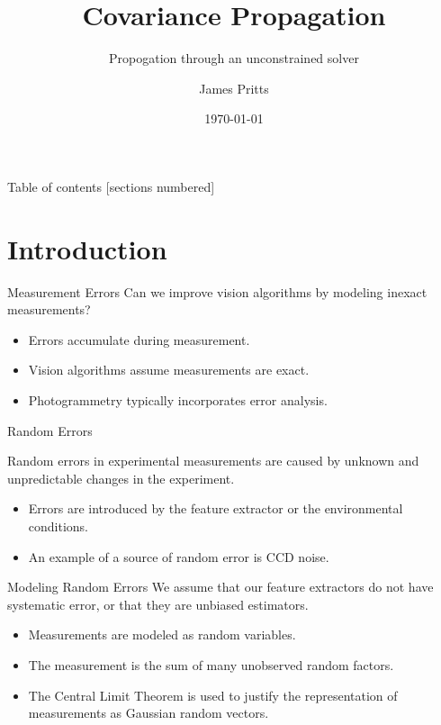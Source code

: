 \documentclass[8pt,aspectratio=169]{beamer}
\title{Covariance Propagation}
\subtitle{Propogation through an unconstrained solver}
\date{\today}
\author{James Pritts}
\institute{Ukrainian Catholic University}
\begin{document}
 

\maketitle

\begin{frame}{Table of contents}
  [sections numbered]
  \tableofcontents%
\end{frame}

\section[Intro]{Introduction}

\begin{frame}[fragile]{Measurement Errors}
  Can we improve vision algorithms by modeling inexact measurements?

  \begin{itemize}
  \item Errors accumulate during measurement. 
  \item Vision algorithms assume measurements are exact.
  \item Photogrammetry typically incorporates error analysis.
  \end{itemize}
\end{frame}

\begin{frame}[fragile]{Random Errors}
  \begin{definition}{Random errors} in experimental measurements are caused by unknown and unpredictable changes in the experiment.
  \end{definition}

  \begin{itemize}
    \item Errors are introduced by the feature extractor or the environmental conditions.
    \item An example of a source of random error is CCD noise.
  \end{itemize}
\end{frame}

\begin{frame}[fragile]{Modeling Random Errors}
  We assume that our feature extractors do not have systematic error,
  or that they are unbiased estimators.
  
  \begin{itemize}
  \item Measurements are modeled as random variables.
  \item The measurement is the sum of many unobserved random factors.
  \item The Central Limit Theorem is used to justify the
    representation of measurements as Gaussian random vectors.
  \end{itemize}
\end{frame}
\end{document}
